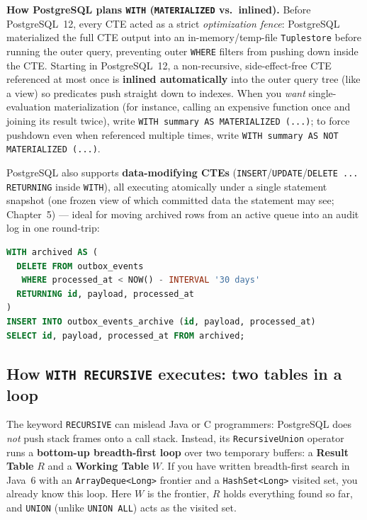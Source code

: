 \begin{implementbox}
\textbf{How PostgreSQL plans \texttt{WITH} (\texttt{MATERIALIZED} vs.\ inlined).} Before PostgreSQL~12, every CTE acted as a strict \emph{optimization fence}: PostgreSQL materialized the full CTE output into an in-memory/temp-file \texttt{Tuplestore} before running the outer query, preventing outer \texttt{WHERE} filters from pushing down inside the CTE. Starting in PostgreSQL~12, a non-recursive, side-effect-free CTE referenced at most once is \textbf{inlined automatically} into the outer query tree (like a view) so predicates push straight down to indexes. When you \emph{want} single-evaluation materialization (for instance, calling an expensive function once and joining its result twice), write \texttt{WITH summary AS MATERIALIZED (...)}; to force pushdown even when referenced multiple times, write \texttt{WITH summary AS NOT MATERIALIZED (...)}.

PostgreSQL also supports \textbf{data-modifying CTEs} (\texttt{INSERT}/\texttt{UPDATE}/\texttt{DELETE ... RETURNING} inside \texttt{WITH}), all executing atomically under a single statement snapshot (one frozen view of which committed data the statement may see; Chapter~5) --- ideal for moving archived rows from an active queue into an audit log in one round-trip:
\begin{lstlisting}[language=SQL]
WITH archived AS (
  DELETE FROM outbox_events
   WHERE processed_at < NOW() - INTERVAL '30 days'
  RETURNING id, payload, processed_at
)
INSERT INTO outbox_events_archive (id, payload, processed_at)
SELECT id, payload, processed_at FROM archived;
\end{lstlisting}
\end{implementbox}

\subsection{How \texttt{WITH RECURSIVE} executes: two tables in a loop}

The keyword \texttt{RECURSIVE} can mislead Java or C programmers: PostgreSQL does \emph{not} push stack frames onto a call stack. Instead, its \texttt{RecursiveUnion} operator runs a \textbf{bottom-up breadth-first loop} over two temporary buffers: a \textbf{Result Table} $R$ and a \textbf{Working Table} $W$. If you have written breadth-first search in Java~6 with an \texttt{ArrayDeque<Long>} frontier and a \texttt{HashSet<Long>} visited set, you already know this loop. Here $W$ is the frontier, $R$ holds everything found so far, and \texttt{UNION} (unlike \texttt{UNION ALL}) acts as the visited set.

